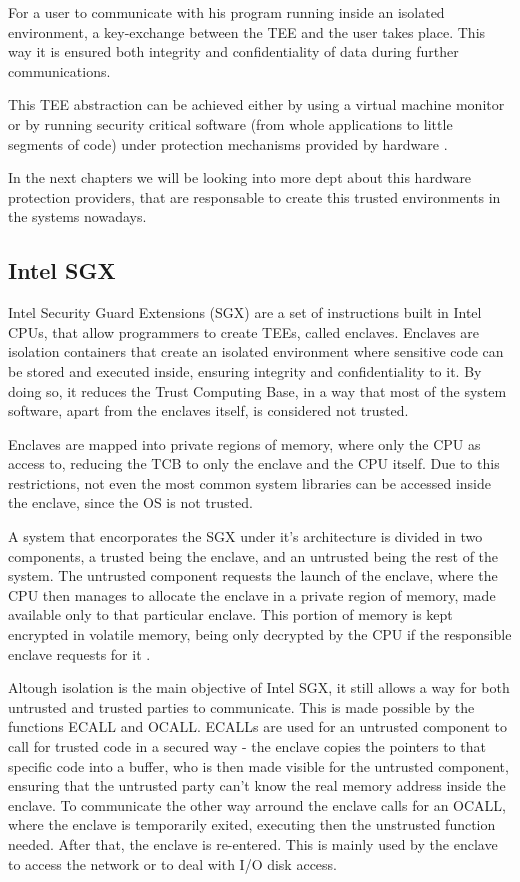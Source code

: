 For a user to communicate with his program running inside an isolated environment, a key-exchange between the TEE and the user takes place. This way it is ensured both integrity and confidentiality of data during further communications.

This TEE abstraction can be achieved either by using a virtual machine monitor or by running security critical software (from whole applications to little segments of code) under protection mechanisms provided by hardware \cite{pcopThesis}. 

In the next chapters we will be looking into more dept about this hardware protection providers, that are responsable to create this trusted environments in the systems nowadays.

\subsection{Intel SGX}
\label{ssec:intelsgx}

Intel Security Guard Extensions (SGX) are a set of instructions built in Intel CPUs, that allow programmers to create TEEs, called enclaves. Enclaves are isolation containers that create an isolated environment where sensitive code can be stored and executed inside, ensuring integrity and confidentiality to it. By doing so, it reduces the Trust Computing Base, in a way that most of the system software, apart from the enclaves itself, is considered not trusted.

Enclaves are mapped into private regions of memory, where only the CPU as access to, reducing the TCB to only the enclave and the CPU itself. Due to this restrictions, not even the most common system libraries can be accessed inside the enclave, since the OS is not trusted. 

A system that encorporates the SGX under it's architecture is divided in two components, a trusted being the enclave, and an untrusted being the rest of the system. The untrusted component requests the launch of the enclave, where the CPU then manages to allocate the enclave in a private region of memory, made available only to that particular enclave. This portion of memory is kept encrypted in volatile memory, being only decrypted by the CPU if the responsible enclave requests for it \cite{guiBorgesThesis}.

Altough isolation is the main objective of Intel SGX, it still allows a way for both  untrusted and trusted parties to communicate. This is made possible by the functions ECALL and OCALL. ECALLs are used for an untrusted component to call for trusted code in a secured way - the enclave copies the pointers to that specific code into a buffer, who is then made visible for the untrusted component, ensuring that the untrusted party can't know the real memory address inside the enclave. To communicate the other way arround the enclave calls for an OCALL, where the enclave is temporarily exited, executing then the unstrusted function needed. After that, the enclave is re-entered. This is mainly used by the enclave to access the network or to deal with I/O disk access.


